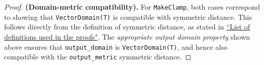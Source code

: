 \documentclass[11pt,a4paper]{article}
\newtheorem{lemma}{Lemma}
\theoremstyle{definition}
\newcommand{\din}{\texttt{d\_in}}
\newcommand{\dout}{\texttt{d\_out}}
\newcommand{\Relation}{\texttt{Relation}}
\newcommand{\X}{\mathcal{X}}
\newcommand{\Y}{\mathcal{Y}}
\newcommand{\False}{\texttt{False}}
\newcommand{\silvia}[1]{{ {\color{blue}{(silvia)~#1}}}}
\newcommand{\grace}[1]{{ {\color{purple}{(grace)~#1}}}}
\begin{document}
\begin{proof}



        


\smallskip
\textbf{(Domain-metric compatibility).}  For \texttt{MakeClamp}, both cases correspond to showing that \texttt{VectorDomain(T)} is compatible with symmetric distance. This follows directly from the definition of symmetric distance, as stated in \href{https://www.overleaf.com/project/60d214e390b337703d200982}{``List of definitions used in the proofs"}. The \textit{appropriate output domain property} shown above ensures that \texttt{output\_domain} is \texttt{VectorDomain(T)}, and hence also compatible with the \texttt{output\_metric} symmetric distance.


\end{proof}
\end{document}
